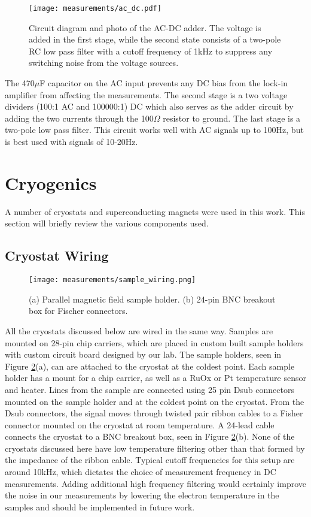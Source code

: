 \begin{figure}
    \centering
    \texttt{[image: measurements/ac\_dc.pdf]}
    \caption{Circuit diagram and photo of the AC-DC adder. The voltage is added in the first stage, while the second state consists of a two-pole RC low pass filter with a cutoff frequency of 1kHz to suppress any switching noise from the voltage sources.}
    \label{fig:ac_dc}
\end{figure}

The 470$\mu$F capacitor on the AC input prevents any DC bias from the lock-in amplifier from affecting the measurements. The second stage is a two voltage dividers (100:1 AC and 100000:1) DC which also serves as the adder circuit by adding the two currents through the 100$\Omega$ resistor to ground. The last stage is a two-pole low pass filter. This circuit works well with AC signals up to 100Hz, but is best used with signals of 10-20Hz.

\section{Cryogenics}

A number of cryostats and superconducting magnets were used in this work. This section will briefly review the various components used.

\subsection{Cryostat Wiring}

\begin{figure}
    \centering
    \texttt{[image: measurements/sample\_wiring.png]}
    \caption{(a) Parallel magnetic field sample holder. (b) 24-pin BNC breakout box for Fischer connectors.}
    \label{fig:wiring}
\end{figure}

All the cryostats discussed below are wired in the same way. Samples are mounted on 28-pin chip carriers, which are placed in custom built sample holders with custom circuit board designed by our lab. The sample holders, seen in Figure \ref{fig:wiring}(a), can are attached to the cryostat at the coldest point. Each sample holder has a mount for a chip carrier, as well as a RuOx or Pt temperature sensor and heater. Lines from the sample are connected using 25 pin Dsub connectors mounted on the sample holder and at the coldest point on the cryostat. From the Dsub connectors, the signal moves through twisted pair ribbon cables to a Fisher connector mounted on the cryostat at room temperature. A 24-lead cable connects the cryostat to a BNC breakout box, seen in Figure \ref{fig:wiring}(b). None of the cryostats discussed here have low temperature filtering other than that formed by the impedance of the ribbon cable. Typical cutoff frequencies for this setup are around 10kHz, which dictates the choice of measurement frequency in DC measurements. Adding additional high frequency filtering would certainly improve the noise in our measurements by lowering the electron temperature in the samples and should be implemented in future work.

